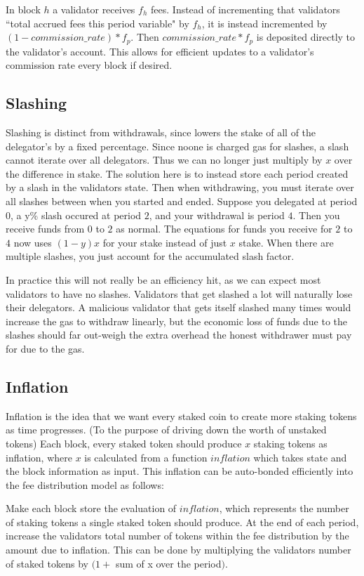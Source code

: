 \documentclass[]{article}
\begin{document}
In block $h$ a validator receives $f_h$ fees.
Instead of incrementing that validators ``total accrued fees this period variable" by $f_h$, it is instead incremented by $(1 - commission\_rate) * f_p$.
Then $commission\_rate * f_p$ is deposited directly to the validator's account.
This allows for efficient updates to a validator's commission rate every block if desired.

\subsection{Slashing}
\label{ssec:slashing}
Slashing is distinct from withdrawals, since lowers the stake of all of the delegator's by a fixed percentage.
Since noone is charged gas for slashes, a slash cannot iterate over all delegators.
Thus we can no longer just multiply by $x$ over the difference in stake. 
The solution here is to instead store each period created by a slash in the validators state.
Then when withdrawing, you must iterate over all slashes between when you started and ended.
Suppose you delegated at period $0$, a y\% slash occured at period $2$, and your withdrawal is period $4$.
Then you receive funds from $0$ to $2$ as normal.
The equations for funds you receive for $2$ to $4$ now uses $(1 - y)x$ for your stake instead of just $x$ stake.
When there are multiple slashes, you just account for the accumulated slash factor.

In practice this will not really be an efficiency hit, as we can expect most validators to have no slashes.
Validators that get slashed a lot will naturally lose their delegators.
A malicious validator that gets itself slashed many times would increase the gas to withdraw linearly, but the economic loss of funds due to the slashes should far out-weigh the extra overhead the honest withdrawer must pay for due to the gas.

\subsection{Inflation}
Inflation is the idea that we want every staked coin to create more staking tokens as time progresses. (To the purpose of driving down the worth of unstaked tokens) Each block, every staked token should produce $x$ staking tokens as inflation, where $x$ is calculated from a function $inflation$ which takes state and the block information as input. This inflation can be auto-bonded efficiently into the fee distribution model as follows:

Make each block store the evaluation of $inflation$, which represents the number of staking tokens a single staked token should produce. 
At the end of each period, increase the validators total number of tokens within the fee distribution by the amount due to inflation. This can be done by multiplying the validators number of staked tokens by $(1 + $ sum of x over the period$)$.
\end{document}
